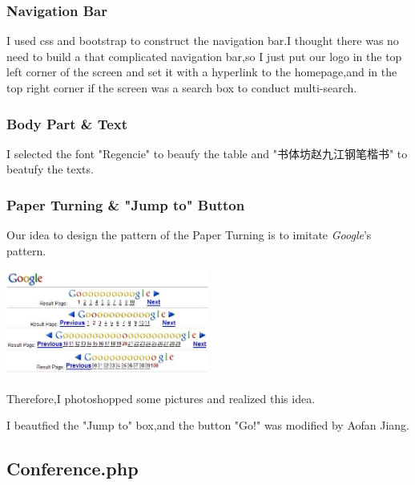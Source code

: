 \documentclass[10pt,twoside,a4paper,titlepage]{article}
\begin{document}
	
	\subsubsection{Navigation Bar}
	
	I used css and bootstrap to construct the navigation bar.I thought there was no need to build a  that complicated navigation bar,so I just put our logo in the top left corner of the screen and set it with a hyperlink to the homepage,and in the top right corner if the screen was a search box to conduct multi-search.
	
	\subsubsection{Body Part \& Text}
	
	I selected the font "Regencie" to beaufy the table and "书体坊赵九江钢笔楷书" to beatufy the texts.
	
	\subsubsection{Paper Turning \& "Jump to" Button }
	
	Our idea to design the pattern of the Paper Turning is to imitate \emph{Google}'s pattern.
	
	\includegraphics[width=0.5\textwidth]{cyf/Google.jpg}
	
	Therefore,I photoshopped some pictures and realized this idea.
	
	I beautfied the "Jump to" box,and the button "Go!" was modified by Aofan Jiang.
	
	
	\subsection{Conference.php}
\end{document}
